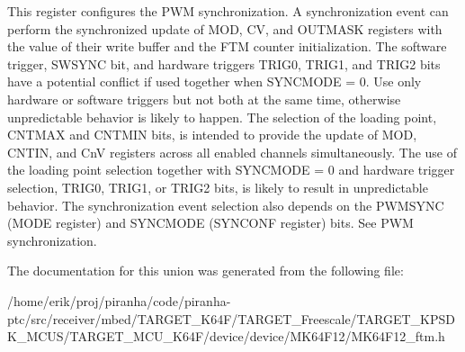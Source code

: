 This register configures the P\+WM synchronization. A synchronization event can perform the synchronized update of M\+OD, CV, and O\+U\+T\+M\+A\+SK registers with the value of their write buffer and the F\+TM counter initialization. The software trigger, S\+W\+S\+Y\+NC bit, and hardware triggers T\+R\+I\+G0, T\+R\+I\+G1, and T\+R\+I\+G2 bits have a potential conflict if used together when S\+Y\+N\+C\+M\+O\+DE = 0. Use only hardware or software triggers but not both at the same time, otherwise unpredictable behavior is likely to happen. The selection of the loading point, C\+N\+T\+M\+AX and C\+N\+T\+M\+IN bits, is intended to provide the update of M\+OD, C\+N\+T\+IN, and CnV registers across all enabled channels simultaneously. The use of the loading point selection together with S\+Y\+N\+C\+M\+O\+DE = 0 and hardware trigger selection, T\+R\+I\+G0, T\+R\+I\+G1, or T\+R\+I\+G2 bits, is likely to result in unpredictable behavior. The synchronization event selection also depends on the P\+W\+M\+S\+Y\+NC (M\+O\+DE register) and S\+Y\+N\+C\+M\+O\+DE (S\+Y\+N\+C\+O\+NF register) bits. See P\+WM synchronization. 

The documentation for this union was generated from the following file\+:\begin{DoxyCompactItemize}
\item 
/home/erik/proj/piranha/code/piranha-\/ptc/src/receiver/mbed/\+T\+A\+R\+G\+E\+T\+\_\+\+K64\+F/\+T\+A\+R\+G\+E\+T\+\_\+\+Freescale/\+T\+A\+R\+G\+E\+T\+\_\+\+K\+P\+S\+D\+K\+\_\+\+M\+C\+U\+S/\+T\+A\+R\+G\+E\+T\+\_\+\+M\+C\+U\+\_\+\+K64\+F/device/device/\+M\+K64\+F12/M\+K64\+F12\+\_\+ftm.\+h\end{DoxyCompactItemize}
